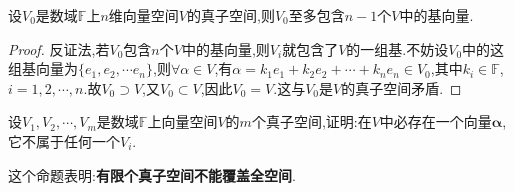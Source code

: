 \documentclass[../../main.tex]{subfiles}%
\begin{document}
\begin{proposition}\label{proposition:真子空间至多包含n-1个基向量}
设\(V_0\)是数域\(\mathbb{F}\)上$n$维向量空间\(V\)的真子空间,则\(V_0\)至多包含$n-1$个$V$中的基向量.
\end{proposition}
\begin{proof}

反证法,若$V_0$包含\(n\)个\(V\)中的基向量,则$V_i$就包含了$V$的一组基.不妨设$V_0$中的这组基向量为$\{e_1,e_2,\cdots e_n\}$,则$\forall \alpha\in V$,有$\alpha =k_1e_1+k_2e_2+\cdots +k_ne_n \in V_0$,其中$k_i\in \mathbb{F}$,$i=1,2,\cdots,n$.故$V_0\supset V$,又$V_0\subset V$,因此$V_0=V$.这与\(V_0\)是\(V\)的真子空间矛盾.

\end{proof}

\begin{proposition}\label{proposition:真子空间外仍有向量存在}
设\(V_1,V_2,\cdots,V_m\)是数域\(\mathbb{F}\)上向量空间\(V\)的\(m\)个真子空间,证明:在\(V\)中必存在一个向量\(\boldsymbol{\alpha}\),它不属于任何一个\(V_i\).
\end{proposition}
\begin{note}
这个命题表明:\textbf{有限个真子空间不能覆盖全空间}.
\end{note}
\end{document}
